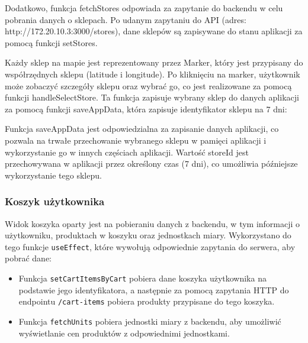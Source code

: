 Dodatkowo, funkcja fetchStores odpowiada za zapytanie do backendu w celu pobrania danych o sklepach. Po udanym zapytaniu do API (adres: http://172.20.10.3:3000/stores), dane sklepów są zapisywane do stanu aplikacji za pomocą funkcji setStores.

Każdy sklep na mapie jest reprezentowany przez Marker, który jest przypisany do współrzędnych sklepu (latitude i longitude). Po kliknięciu na marker, użytkownik może zobaczyć szczegóły sklepu oraz wybrać go, co jest realizowane za pomocą funkcji handleSelectStore. Ta funkcja zapisuje wybrany sklep do danych aplikacji za pomocą funkcji saveAppData, która zapisuje identyfikator sklepu na 7 dni:

Funkcja saveAppData jest odpowiedzialna za zapisanie danych aplikacji, co pozwala na trwałe przechowanie wybranego sklepu w pamięci aplikacji i wykorzystanie go w innych częściach aplikacji. Wartość storeId jest przechowywana w aplikacji przez określony czas (7 dni), co umożliwia późniejsze wykorzystanie tego sklepu.

\subsubsection{Koszyk użytkownika}
    Widok koszyka oparty jest na pobieraniu danych z backendu, w tym informacji o użytkowniku, produktach w koszyku oraz jednostkach miary. Wykorzystano do tego funkcje \texttt{useEffect}, które wywołują odpowiednie zapytania do serwera, aby pobrać dane:
    \begin{itemize}
    \item Funkcja \texttt{setCartItemsByCart} pobiera dane koszyka użytkownika na podstawie jego identyfikatora, a następnie za pomocą zapytania HTTP do endpointu \texttt{/cart-items} pobiera produkty przypisane do tego koszyka.
    \item Funkcja \texttt{fetchUnits} pobiera jednostki miary z backendu, aby umożliwić wyświetlanie cen produktów z odpowiednimi jednostkami.
    \end{itemize}

